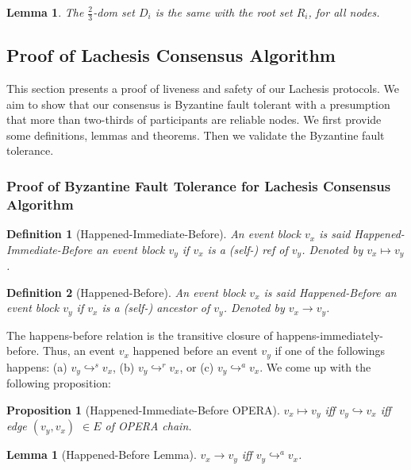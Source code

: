 \documentclass{article}
\newtheorem{lem}[thm]{Lemma}
\newtheorem{prop}[thm]{Proposition}
\newtheorem{defn}{Definition}[section]
\newcommand{\eself}{\hookrightarrow^{s}}
\newcommand{\eref}{\hookrightarrow^{r}}
\newcommand{\eancestor}{\hookrightarrow^{a}}
\newcommand{\erefz}{\hookrightarrow}
\newcommand{\hibefore}{\mapsto}
\newcommand{\hbefore}{\rightarrow}
\begin{document}
\begin{lem}
	The $\frac{2}{3}$-dom set $D_i$ is the same with the root set $R_i$, for all nodes.
\end{lem}

\subsection{Proof of Lachesis Consensus Algorithm}\label{se:proof}
This section presents a proof of liveness and safety  of our Lachesis protocols. We aim to show that our consensus is Byzantine fault tolerant with a presumption that more than two-thirds of participants are reliable nodes. We first provide some definitions, lemmas and theorems. Then we validate the Byzantine fault tolerance. 

\subsubsection{Proof of Byzantine Fault Tolerance for Lachesis Consensus Algorithm}

\begin{defn}[Happened-Immediate-Before]
An event block $v_x$ is said Happened-Immediate-Before an event block $v_y$ if $v_x$ is a (self-) ref of $v_y$. Denoted by $v_x \hibefore v_y$.
\end{defn}

\begin{defn}[Happened-Before]	
	 An event block $v_x$ is said Happened-Before an event block $v_y$ if $v_x$ is a (self-) ancestor of $v_y$. Denoted by $v_x \hbefore v_y$.
\end{defn}

The happens-before relation is the transitive closure of happens-immediately-before.
Thus, an event $v_x$ happened before an event $v_y$ if one of the followings happens: (a) $v_y \eself v_x$, (b) $v_y \eref v_x$,  or (c) $v_y \eancestor v_x$.
 We come up with the following proposition:
\begin{prop}[Happened-Immediate-Before OPERA]
$v_x \hibefore v_y$ iff $v_y \erefz v_x$ iff edge $(v_y, v_x)$ $\in E$ of OPERA chain.
\end{prop}
\begin{lem}[Happened-Before Lemma]
	$v_x \hbefore v_y$ iff $v_y \eancestor v_x$.
\end{lem}
\end{document}
